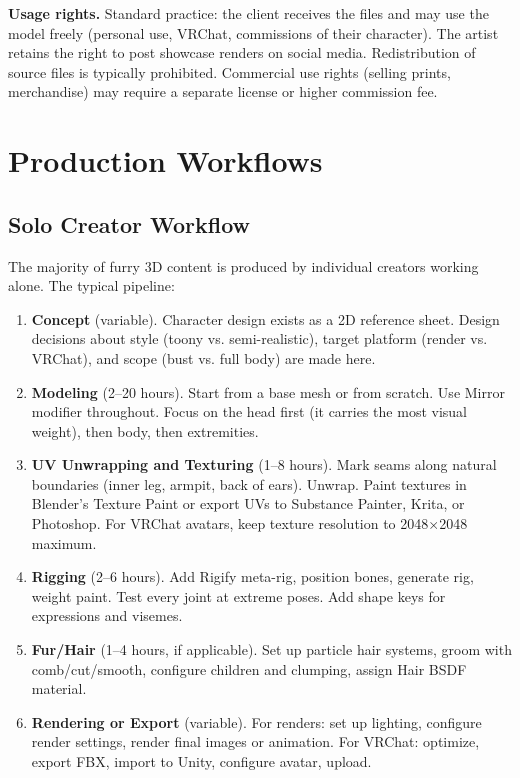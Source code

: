\textbf{Usage rights.} Standard practice: the client receives the files and may use the model freely (personal use, VRChat, commissions of their character). The artist retains the right to post showcase renders on social media. Redistribution of source files is typically prohibited. Commercial use rights (selling prints, merchandise) may require a separate license or higher commission fee.



\section{Production Workflows}
\label{sec:furry-production}

\subsection{Solo Creator Workflow}

The majority of furry 3D content is produced by individual creators working alone. The typical pipeline:

\begin{enumerate}[leftmargin=2em]
  \item \textbf{Concept} (variable). Character design exists as a 2D reference sheet. Design decisions about style (toony vs. semi-realistic), target platform (render vs. VRChat), and scope (bust vs. full body) are made here.

  \item \textbf{Modeling} (2--20 hours). Start from a base mesh or from scratch. Use Mirror modifier throughout. Focus on the head first (it carries the most visual weight), then body, then extremities.

  \item \textbf{UV Unwrapping and Texturing} (1--8 hours). Mark seams along natural boundaries (inner leg, armpit, back of ears). Unwrap. Paint textures in Blender's Texture Paint or export UVs to Substance Painter, Krita, or Photoshop. For VRChat avatars, keep texture resolution to 2048$\times$2048 maximum.

  \item \textbf{Rigging} (2--6 hours). Add Rigify meta-rig, position bones, generate rig, weight paint. Test every joint at extreme poses. Add shape keys for expressions and visemes.

  \item \textbf{Fur/Hair} (1--4 hours, if applicable). Set up particle hair systems, groom with comb/cut/smooth, configure children and clumping, assign Hair BSDF material.

  \item \textbf{Rendering or Export} (variable). For renders: set up lighting, configure render settings, render final images or animation. For VRChat: optimize, export FBX, import to Unity, configure avatar, upload.
\end{enumerate}

